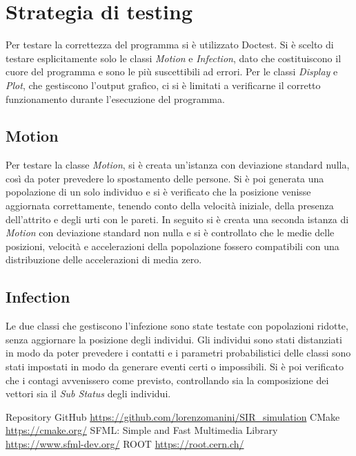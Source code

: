\documentclass[a4paper,10pt,twocolumn]{article}
\begin{document}
\section{Strategia di testing}
Per testare la correttezza del programma si è utilizzato Doctest. Si è scelto di testare esplicitamente solo le classi \emph{Motion} e \emph{Infection}, dato che costituiscono il cuore del programma e sono le più suscettibili ad errori. Per le classi \emph{Display} e \emph{Plot}, che gestiscono l'output grafico, ci si è limitati a verificarne il corretto funzionamento durante l'esecuzione del programma.

\subsection*{Motion}
Per testare la classe \emph{Motion}, si è creata un'istanza con deviazione standard nulla, così da poter prevedere lo spostamento delle persone. Si è poi generata una popolazione di un solo individuo e si è verificato che la posizione venisse aggiornata correttamente, tenendo conto della velocità iniziale, della presenza dell'attrito e degli urti con le pareti. In seguito si è creata una seconda istanza di \emph{Motion} con deviazione standard non nulla e si è controllato che le medie delle posizioni, velocità e accelerazioni della popolazione fossero compatibili con una distribuzione delle accelerazioni di media zero.

\subsection*{Infection}
Le due classi che gestiscono l'infezione sono state testate con popolazioni ridotte, senza aggiornare la posizione degli individui. Gli individui sono stati distanziati in modo da poter prevedere i contatti e i parametri probabilistici delle classi sono stati impostati in modo da generare eventi certi o impossibili. Si è poi verificato che i contagi avvenissero come previsto, controllando sia la composizione dei vettori sia il \emph{Sub Status} degli individui.

\begin{thebibliography}{9}
     Repository GitHub \url{https://github.com/lorenzomanini/SIR\_simulation}
     CMake \url{https://cmake.org/}
     SFML: Simple and Fast Multimedia Library \url{https://www.sfml-dev.org/}
     ROOT \url{https://root.cern.ch/}
\end{thebibliography}
\end{document}
